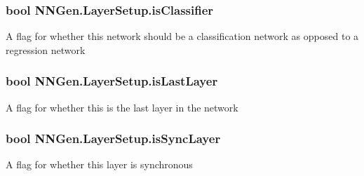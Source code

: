 \hypertarget{class_n_n_gen_1_1_layer_setup_adbccceab05f4b3f3f7aba558408f4e94}{}
\subsubsection[{is\+Classifier}]{\setlength{\rightskip}{0pt plus 5cm}bool N\+N\+Gen.\+Layer\+Setup.\+is\+Classifier\hspace{0.3cm}{\ttfamily [get]}}\label{class_n_n_gen_1_1_layer_setup_adbccceab05f4b3f3f7aba558408f4e94}


A flag for whether this network should be a classification network as opposed to a regression network 

\hypertarget{class_n_n_gen_1_1_layer_setup_a7c89db95e04b0f4b046786ba56b97b76}{}
\subsubsection[{is\+Last\+Layer}]{\setlength{\rightskip}{0pt plus 5cm}bool N\+N\+Gen.\+Layer\+Setup.\+is\+Last\+Layer\hspace{0.3cm}{\ttfamily [get]}}\label{class_n_n_gen_1_1_layer_setup_a7c89db95e04b0f4b046786ba56b97b76}


A flag for whether this is the last layer in the network 

\hypertarget{class_n_n_gen_1_1_layer_setup_a3c8d928b37fc46a8098bb9698dbd622c}{}
\subsubsection[{is\+Sync\+Layer}]{\setlength{\rightskip}{0pt plus 5cm}bool N\+N\+Gen.\+Layer\+Setup.\+is\+Sync\+Layer\hspace{0.3cm}{\ttfamily [get]}}\label{class_n_n_gen_1_1_layer_setup_a3c8d928b37fc46a8098bb9698dbd622c}


A flag for whether this layer is synchronous 

\hypertarget{class_n_n_gen_1_1_layer_setup_ad02db2fa93e561ffd181ad7824d6b296}{}
